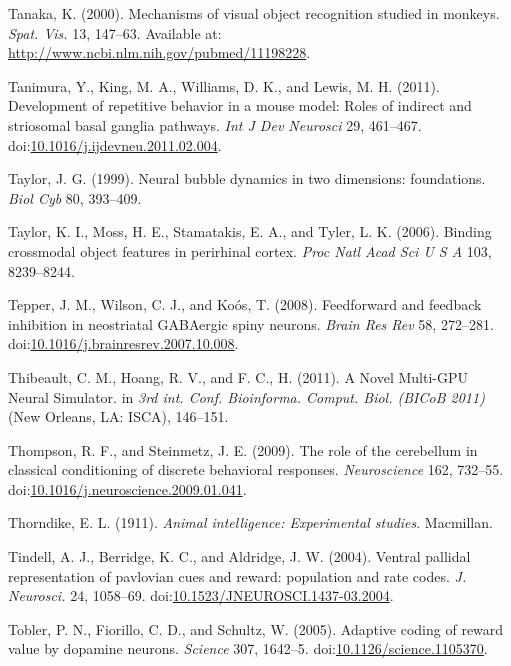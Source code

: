 \documentclass[
  11pt,
  a4paper,
]{scrbook}
\newlength{\cslhangindent}
\newenvironment{CSLReferences}[2] %
 {\begin{list}{}{%
  \setlength{\itemindent}{0pt}
  \setlength{\leftmargin}{0pt}
  \setlength{\parsep}{0pt}
  \ifodd #1
   \setlength{\leftmargin}{\cslhangindent}
   \setlength{\itemindent}{-1\cslhangindent}
  \fi
  \setlength{\itemsep}{#2\baselineskip}}}
 {\end{list}}
\begin{document}
\begin{CSLReferences}{1}{1}
Tanaka, K. (2000). {Mechanisms of visual object recognition studied in
monkeys.} \emph{Spat. Vis.} 13, 147--63. Available at:
\url{http://www.ncbi.nlm.nih.gov/pubmed/11198228}.

Tanimura, Y., King, M. A., Williams, D. K., and Lewis, M. H. (2011).
Development of repetitive behavior in a mouse model: Roles of indirect
and striosomal basal ganglia pathways. \emph{Int J Dev Neurosci} 29,
461--467.
doi:\href{https://doi.org/10.1016/j.ijdevneu.2011.02.004}{10.1016/j.ijdevneu.2011.02.004}.

Taylor, J. G. (1999). Neural bubble dynamics in two dimensions:
foundations. \emph{Biol Cyb} 80, 393--409.

Taylor, K. I., Moss, H. E., Stamatakis, E. A., and Tyler, L. K. (2006).
Binding crossmodal object features in perirhinal cortex. \emph{Proc Natl
Acad Sci U S A} 103, 8239--8244.

Tepper, J. M., Wilson, C. J., and Koós, T. (2008). Feedforward and
feedback inhibition in neostriatal {GABAergic} spiny neurons.
\emph{Brain Res Rev} 58, 272--281.
doi:\href{https://doi.org/10.1016/j.brainresrev.2007.10.008}{10.1016/j.brainresrev.2007.10.008}.

Thibeault, C. M., Hoang, R. V., and F. C., H. (2011). {A Novel Multi-GPU
Neural Simulator}. in \emph{3rd int. Conf. Bioinforma. Comput. Biol.
(BICoB 2011)} (New Orleans, LA: ISCA), 146--151.

Thompson, R. F., and Steinmetz, J. E. (2009). {The role of the
cerebellum in classical conditioning of discrete behavioral responses.}
\emph{Neuroscience} 162, 732--55.
doi:\href{https://doi.org/10.1016/j.neuroscience.2009.01.041}{10.1016/j.neuroscience.2009.01.041}.

Thorndike, E. L. (1911). \emph{Animal intelligence: Experimental
studies}. Macmillan.

Tindell, A. J., Berridge, K. C., and Aldridge, J. W. (2004). {Ventral
pallidal representation of pavlovian cues and reward: population and
rate codes.} \emph{J. Neurosci.} 24, 1058--69.
doi:\href{https://doi.org/10.1523/JNEUROSCI.1437-03.2004}{10.1523/JNEUROSCI.1437-03.2004}.

Tobler, P. N., Fiorillo, C. D., and Schultz, W. (2005). {Adaptive coding
of reward value by dopamine neurons.} \emph{Science} 307, 1642--5.
doi:\href{https://doi.org/10.1126/science.1105370}{10.1126/science.1105370}.


\end{CSLReferences}
\end{document}
